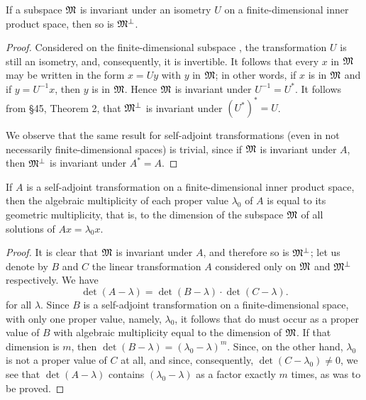 \begin{theorem}
    If a subspace \(\mathfrak{M}\) is invariant under an isometry \(U\) on a finite-dimensional inner product space, then so is \(\mathfrak{M}^{\perp}\).
\end{theorem}

\begin{proof}
    Considered on the finite-dimensional subspace , the transformation \(U\) is
    still an isometry, and, consequently, it is invertible. It follows that
    every \(x\) in \(\mathfrak{M}\) may be written in the form \(x = Uy\) with \(y\)
    in \(\mathfrak{M}\); in other words, if \(x\) is in \(\mathfrak{M}\) and if \(y =
    U^{-1}x\), then \(y\) is in \(\mathfrak{M}\). Hence \(\mathfrak{M}\) is invariant under
    \(U^{-1} = U^*\). It follows from §45, Theorem 2, that \(\mathfrak{M}^{\perp}\) is
    invariant under \((U^*)^* = U\).
    
    We observe that the same result for self-adjoint transformations (even in
    not necessarily finite-dimensional spaces) is trivial, since  if \(\mathfrak{M}\)
    is invariant under \(A\), then \(\mathfrak{M}^{\perp}\) is invariant under \(A^* =
    A\).
\end{proof}

\begin{theorem}
    If \(A\) is a self-adjoint transformation on a finite-dimensional inner product space, then the algebraic multiplicity of each proper value \(\lambda_0\) of \(A\) is equal to its geometric multiplicity, that is, to the dimension of the subspace \(\mathfrak{M}\) of all solutions of \(Ax = \lambda_0 x\).
\end{theorem}

\begin{proof}
    It is clear that \(\mathfrak{M}\) is invariant under \(A\), and therefore so is
    \(\mathfrak{M}^{\perp}\); let us denote by \(B\) and \(C\) the linear
    transformation \(A\) considered only on \(\mathfrak{M}\) and \(\mathfrak{M}^{\perp}\)
    respectively. We have 
    \begin{equation*}
        \det (A - \lambda) = \det (B - \lambda) \cdot \det (C - \lambda).
    \end{equation*}
    for all \(\lambda\). Since \(B\) is a self-adjoint transformation on a
    finite-dimensional space, with only one proper value, namely, \(\lambda_0\),
    it follows that do must occur as a proper value of \(B\) with algebraic
    multiplicity equal to the dimension of \(\mathfrak{M}\). If that dimension is
    \(m\), then \(\det (B - \lambda) = (\lambda_0 - \lambda)^m\). Since, on the
    other hand, \(\lambda_0\) is not a proper value of \(C\) at all, and since,
    consequently, \(\det (C - \lambda_0) \neq 0\), we see that \(\det (A -
    \lambda)\) contains \((\lambda_0 - \lambda)\) as a factor exactly \(m\)
    times, as was to be proved.
\end{proof}

